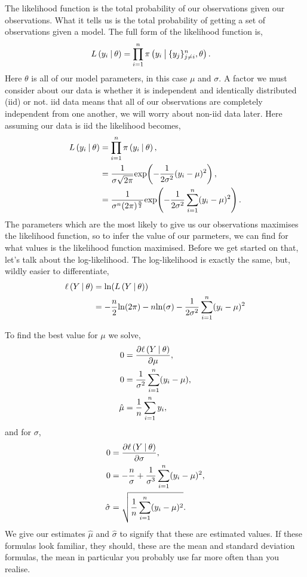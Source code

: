 The likelihood function is the total probability of our observations given our observations. What it tells us is the total probability of getting a set of observations given a model. The full form of the likelihood function is,
\begin{align}
    L\left( y_i \:\middle|\: \theta \right) &= \prod_{i=1}^{n} \pi \left( y_i \:\middle|\: \{y_j\}^n_{j \neq i}, \theta \right).
\end{align}
Here $\theta$ is all of our model parameters, in this case $\mu$ and $\sigma$. A factor we must consider about our data is whether it is independent and identically distributed (iid) or not. iid data means that all of our observations are completely independent from one another, we will worry about non-iid data later. Here assuming our data is iid the likelihood becomes,
\begin{align*}
    L\left( y_i \:\middle|\: \theta \right) &= \prod_{i=1}^{n} \pi \left( y_i \:\middle|\: \theta \right),\\
    &= \frac{1}{\sigma\sqrt{2\pi}}\mathrm{exp}\!\left( -\frac{1}{2\sigma^2}(y_i-\mu)^2 \right),\\
    &= \frac{1}{\sigma^n(2\pi)^\frac{n}{2}}\mathrm{exp}\!\left( -\frac{1}{2\sigma^2}\sum_{i=1}^{n}(y_i-\mu)^2 \right).
\end{align*}
The parameters which are the most likely to give us our observations maximises the likelihood function, so to infer the value of our parmeters, we can find for what values is the likelihood function maximised. Before we get started on that, let's talk about the log-likelihood. The log-likelihood is exactly the same, but, wildly easier to differentiate,
\begin{align*}
    \ell\left( Y \:\middle|\: \theta \right) &= \mathrm{ln}\!\left( L\left( Y \:\middle|\: \theta \right) \right)\\
    &= -\frac{n}{2}\mathrm{ln}\!\left( 2\pi \right)-n\mathrm{ln}\!\left( \sigma \right)-\frac{1}{2\sigma^2}\sum_{i=1}^{n}(y_i-\mu)^2
\end{align*}

To find the best value for $\mu$ we solve,
\begin{align*}
    0 &= \dfrac{\partial \ell\left( Y \:\middle|\: \theta \right)}{\partial \mu},\\
    0 &= \frac{1}{\sigma^2}\sum_{i=1}^{n} (y_i-\mu),\\
    \hat{\mu} &= \frac{1}{n}\sum_{i=1}^{n} y_i,
\end{align*}
and for $\sigma$,
\begin{align*}
    0 &= \dfrac{\partial \ell\left( Y \:\middle|\: \theta \right)}{\partial \sigma},\\
    0 &= -\frac{n}{\sigma} + \frac{1}{\sigma^3} \sum_{i=1}^{n} (y_i-\mu)^2,\\
    \hat{\sigma} &= \sqrt{\frac{1}{n}\sum_{i=1}^{n} (y_i-\mu)^2}.
\end{align*}
We give our estimates $\hat{\mu}$ and $\hat{\sigma}$ to signify that these are estimated values. If these formulas look familiar, they should, these are the mean and standard deviation formulas, the mean in particular you probably use far more often than you realise.





